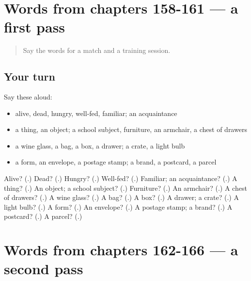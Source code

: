 \section[(dialogue)]{Words from chapters 158-161 — a first pass}

\label{lesson:RU-R166-first-pass-words-from-chapters-158-161}



\begin{quote}
Say the words for a match and a training session.
\end{quote}

\subsection*{Your turn}
Say these aloud:

\begin{itemize}
\raggedright
  \item alive, dead, hungry, well-fed, familiar; an acquaintance
  \item a thing, an object; a school subject, furniture, an armchair, a chest of drawers
  \item a wine glass, a bag, a box, a drawer; a crate, a light bulb
  \item a form, an envelope, a postage stamp; a brand, a postcard, a parcel
\end{itemize}

\begin{tcolorbox}[breakable,colback=teal!4,colframe=teal!35!black,title={Before you move on}]
Alive? (\textbf{}.) Dead? (\textbf{}.) Hungry? (\textbf{}.) Well-fed? (\textbf{}.) Familiar; an acquaintance? (\textbf{}.) A thing? (\textbf{}.) An object; a school subject? (\textbf{}.) Furniture? (\textbf{}.) An armchair? (\textbf{}.) A chest of drawers? (\textbf{}.) A wine glass? (\textbf{}.) A bag? (\textbf{}.) A box? (\textbf{}.) A drawer; a crate? (\textbf{}.) A light bulb? (\textbf{}.) A form? (\textbf{}.) An envelope? (\textbf{}.) A postage stamp; a brand? (\textbf{}.) A postcard? (\textbf{}.) A parcel? (\textbf{}.)
\end{tcolorbox}
\section[(dialogue)]{Words from chapters 162-166 — a second pass}

